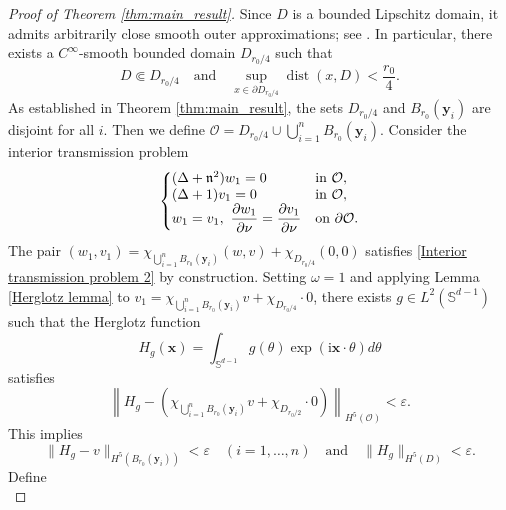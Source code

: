 \documentclass[11pt,reqno,oneside]{amsart}
\numberwithin{equation}{section}
\theoremstyle{definition}
\theoremstyle{remark}
\numberwithin{equation}{section}
\begin{document}
\begin{proof}[Proof of Theorem \ref{thm:main_result}]
	Since $D$ is a bounded Lipschitz domain, it admits arbitrarily close smooth outer approximations; see \cite{Antonini}. In particular, there exists a $C^\infty$-smooth bounded domain $D_{r_0/4}$ such that
		\begin{equation*}
			D \Subset D_{r_0/4}
			\quad \text{and} \quad
			\sup_{x \in \partial D_{r_0/4}} \operatorname{dist}(x,D) < \frac{r_0}{4}.
		\end{equation*}
		As established in Theorem \ref{thm:main_result}, the sets \(D_{r_0/4}\) and \(B_{r_0}(\mathbf{y}_i)\) are disjoint for all \(i\). Then we define $\mathcal{O} = D_{r_0/4} \cup \bigcup_{i=1}^{n} B_{r_0}(\mathbf{y}_i)$. Consider the interior transmission problem
		\begin{equation}\label{Interior transmission problem 2}
			\left\{\begin{array}{@{}ll@{}}
				(\Delta +  \mathfrak{n}^2) w_1 = 0 & \text{in } \mathcal{O}, \\
				(\Delta + 1) v_1 = 0 & \text{in } \mathcal{O}, \\
				w_1 = v_1,\ \dfrac{\partial w_1}{\partial \nu} = \dfrac{\partial v_1}{\partial \nu} & \text{on } \partial \mathcal{O}.
			\end{array}\right.
		\end{equation}
		The pair $(w_1, v_1) = \chi_{\bigcup_{i=1}^n B_{r_0}(\mathbf{y}_i)} (w,v) + \chi_{D_{r_0/4}} (0,0)$ satisfies \eqref{Interior transmission problem 2} by construction. Setting $\omega=1$ and applying Lemma \ref{Herglotz lemma} to $v_1=\chi_{\bigcup_{i=1}^n B_{r_0}(\mathbf{y}_i)} v + \chi_{D_{r_0/4}} \cdot 0$, there exists $g \in L^2(\mathbb{S}^{d-1})$ such that the Herglotz function
		\begin{equation}\label{eq Hg}
			H_g(\mathbf{x}) = \int_{\mathbb{S}^{d-1}} g(\theta) \exp(\mathrm{i} \mathbf{x} \cdot \theta)  d\theta
		\end{equation}
		satisfies
		\begin{equation}\label{eq3.14}
			\left\| H_g - \left( \chi_{\bigcup_{i=1}^n B_{r_0}(\mathbf{y}_i)} v + \chi_{D_{r_0/2}} \cdot 0 \right) \right\|_{H^5(\mathcal{O})} < \varepsilon.
		\end{equation}
		This implies
		\begin{equation}\label{important estimate for H_g}
			\| H_g - v \|_{H^5(B_{r_0}(\mathbf{y}_i))} < \varepsilon \quad (i=1,\dots,n) \quad \text{and} \quad \| H_g \|_{H^5(D)} < \varepsilon.
		\end{equation}
		Define
		\begin{equation}\label{u_0}

\end{equation}
\end{proof}
\end{document}
